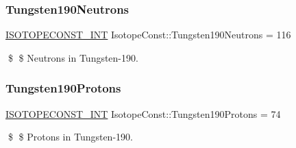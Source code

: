 \subsubsection{\texorpdfstring{Tungsten190\+Neutrons}{Tungsten190Neutrons}}
{\footnotesize\ttfamily \mbox{\hyperlink{group___isotope_const-_macros_ga5f18360b3e99483a35c32d789e62621c}{I\+S\+O\+T\+O\+P\+E\+C\+O\+N\+S\+T\+\_\+\+I\+NT}} Isotope\+Const\+::\+Tungsten190\+Neutrons = 116}

\$ \$ Neutrons in Tungsten-\/190. \mbox{\label{group___isotope_const-_tungsten-_w190_ga90676d06cb34230a999301a1d6365bba}} 
\subsubsection{\texorpdfstring{Tungsten190\+Protons}{Tungsten190Protons}}
{\footnotesize\ttfamily \mbox{\hyperlink{group___isotope_const-_macros_ga5f18360b3e99483a35c32d789e62621c}{I\+S\+O\+T\+O\+P\+E\+C\+O\+N\+S\+T\+\_\+\+I\+NT}} Isotope\+Const\+::\+Tungsten190\+Protons = 74}

\$ \$ Protons in Tungsten-\/190. 